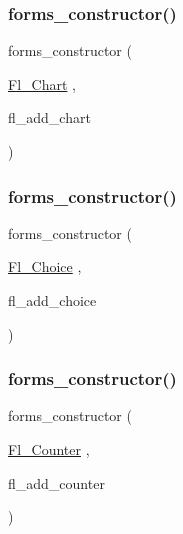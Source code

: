 \mbox{\label{forms_8_h_a5977b1074c3f616706623acfb958ec6c}} 
\subsubsection{\texorpdfstring{forms\+\_\+constructor()}{forms\_constructor()}\hspace{0.1cm}{\footnotesize\ttfamily [3/10]}}
{\footnotesize\ttfamily forms\+\_\+constructor (\begin{DoxyParamCaption}\item[{\hyperlink{class_fl___chart}{Fl\+\_\+\+Chart}}]{,  }\item[{fl\+\_\+add\+\_\+chart}]{ }\end{DoxyParamCaption})}

\mbox{\label{forms_8_h_a9bfb20b0c547dd6c2bc52dab888c0a6b}} 
\subsubsection{\texorpdfstring{forms\+\_\+constructor()}{forms\_constructor()}\hspace{0.1cm}{\footnotesize\ttfamily [4/10]}}
{\footnotesize\ttfamily forms\+\_\+constructor (\begin{DoxyParamCaption}\item[{\hyperlink{class_fl___choice}{Fl\+\_\+\+Choice}}]{,  }\item[{fl\+\_\+add\+\_\+choice}]{ }\end{DoxyParamCaption})}

\mbox{\label{forms_8_h_ab85a9db2f395c20da75e404d86bbe90f}} 
\subsubsection{\texorpdfstring{forms\+\_\+constructor()}{forms\_constructor()}\hspace{0.1cm}{\footnotesize\ttfamily [5/10]}}
{\footnotesize\ttfamily forms\+\_\+constructor (\begin{DoxyParamCaption}\item[{\hyperlink{class_fl___counter}{Fl\+\_\+\+Counter}}]{,  }\item[{fl\+\_\+add\+\_\+counter}]{ }\end{DoxyParamCaption})}

